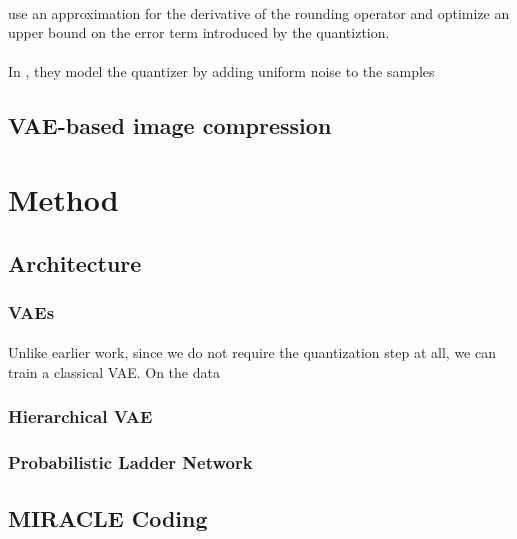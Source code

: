 \documentclass{article}
\begin{document}
\paragraph{}
\cite{theis2017lossy} use an approximation for the derivative of the rounding
operator and optimize an upper bound on the error term introduced by the
quantiztion.
\paragraph{}
In \cite{balle2016end},\cite{balle2018variational} they model the quantizer by
adding uniform noise to the samples 
\subsection{VAE-based image compression}
\section{Method}

\subsection{Architecture}
\subsubsection{VAEs}
\paragraph{}
Unlike earlier work, since we do not require the quantization step at all, we
can train a classical VAE. On the data

\subsubsection{Hierarchical VAE}
\paragraph{}

\subsubsection{Probabilistic Ladder Network}
\paragraph{}

\subsection{MIRACLE Coding}
\end{document}
